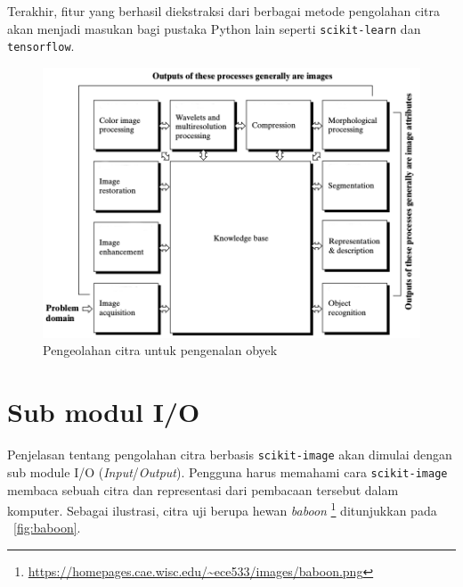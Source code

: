 Terakhir, fitur yang berhasil diekstraksi dari berbagai metode pengolahan citra akan menjadi masukan bagi pustaka Python lain seperti \texttt{scikit-learn} dan \texttt{tensorflow}.

\begin{figure}[h!]
  \begin{center}
    \includegraphics[scale=.5]{pics/steps.png}
    \caption{Pengeolahan citra untuk pengenalan obyek \cite{Gonzalez}}
    \label{fig:targetProcessing}
  \end{center}
\end{figure}

\section{Sub modul I/O}
Penjelasan tentang pengolahan citra berbasis \texttt{scikit-image} akan dimulai dengan sub module I/O (\textit{Input}/\textit{Output}). Pengguna harus memahami cara \texttt{scikit-image} membaca sebuah citra dan representasi dari pembacaan tersebut dalam komputer. Sebagai ilustrasi, citra uji berupa hewan \textit{baboon} \footnote{\url{https://homepages.cae.wisc.edu/~ece533/images/baboon.png}} ditunjukkan pada \figurename~\ref{fig:baboon}. 

